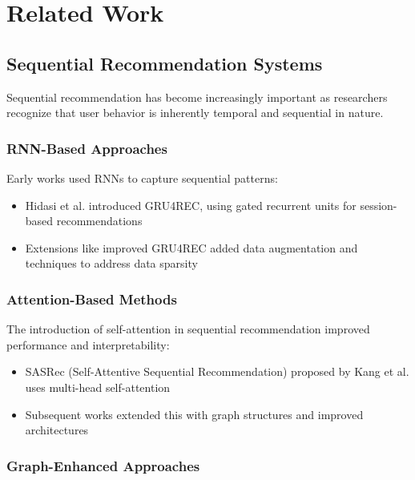 
\section{Related Work}

\subsection{Sequential Recommendation Systems}

Sequential recommendation has become increasingly important as researchers recognize that user behavior is inherently temporal and sequential in nature.

\subsubsection{RNN-Based Approaches}

Early works used RNNs to capture sequential patterns:

\begin{itemize}
    \item Hidasi et al. introduced GRU4REC, using gated recurrent units for session-based recommendations
    \item Extensions like improved GRU4REC added data augmentation and techniques to address data sparsity
\end{itemize}

\subsubsection{Attention-Based Methods}

The introduction of self-attention in sequential recommendation improved performance and interpretability:

\begin{itemize}
    \item SASRec (Self-Attentive Sequential Recommendation) proposed by Kang et al. uses multi-head self-attention
    \item Subsequent works extended this with graph structures and improved architectures
\end{itemize}

\subsubsection{Graph-Enhanced Approaches}

